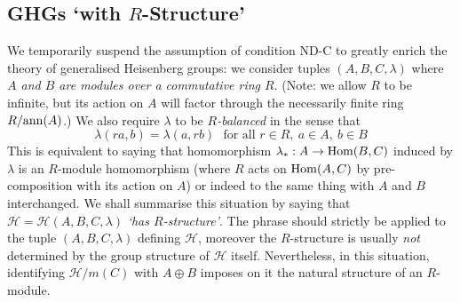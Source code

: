 \documentclass[12pt]{article}
\newcommand{\addwords}[1]{\ \ \ \mbox{#1}}
\newcommand{\ann}{{\rm ann}}
\newcommand{\bbZ}{\ensuremath{\mathbb{Z}}}
\newcommand{\cH}{\ensuremath{\mathcal{H}}}
\newcommand{\Hom}{{\rm Hom}}
\newcommand{\Zover}[1]{\ensuremath{\bbZ/#1}}
\newcommand{\Hei}[4]{\cH({#1},{#2},{#3},{#4})}
\newcommand{\HeiStan}{\Hei{A}{B}{C}{\lambda}}
\begin{document}
\subsection{GHGs `with $R$-Structure'}
We temporarily suspend the assumption of condition ND-C to greatly enrich the theory of generalised Heisenberg groups: 
we consider tuples $(A,B,C,\lambda)$  
where\textit{ $A$ and $B$ are modules over a commutative ring $R$}. (Note: we allow $R$ to be infinite, but its action on $A$ will factor through the necessarily finite ring $R/\ann(A)$.)
We also require $\lambda$ to be {\em $R$-balanced} in the sense that 
\begin{equation}\label{eq: lambda is R-balanced}
	\lambda(ra,b)=\lambda(a,rb)\addwords{for all $r\in R,\ a\in A,\ b\in B$}
\end{equation}
This is equivalent to saying that homomorphism 
$\lambda_\ast: A \rightarrow \Hom(B,C)$ induced by $\lambda$ is an $R$-module homomorphism (where $R$ acts on  $\Hom(A,C)$ by pre-composition with its action on $A$) or indeed to the same thing with $A$ and $B$ interchanged. 
We shall summarise this situation by saying that $\cH=\HeiStan$ \textit{`has $R$-structure'}. The phrase should strictly be applied to the tuple $(A,B,C,\lambda)$ defining $\cH$, moreover the $R$-structure is usually \textit{not} determined by the group structure of $\cH$ itself. Nevertheless, in this situation, identifying $\cH/m(C)$ with $A\oplus B$ imposes on it the natural structure of an $R$-module. 
\end{document}
